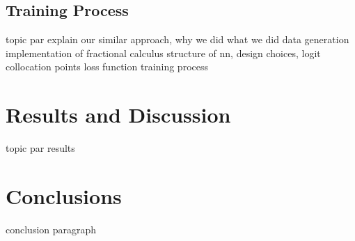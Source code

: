 \documentclass{article}
\begin{document}
	\subsection{Training Process}
	\label{subsection:Training_Process}
	
	topic par
	explain our similar approach, why we did what we did
	data generation
	implementation of fractional calculus
	structure of nn, design choices, logit
	collocation points
	loss function
	training process
	
	\section{Results and Discussion}
	\label{section:Results_and_Discussion}
	
	topic par
	results
	
	\section{Conclusions}
	\label{section:Conclusions}
	
	conclusion paragraph
\end{document}
